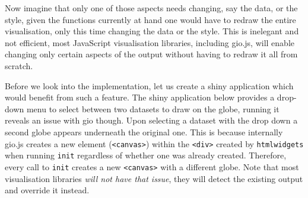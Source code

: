 \documentclass[10pt,]{krantz}
\begin{document}
Now imagine that only one of those aspects needs changing, say the data, or the style, given the functions currently at hand one would have to redraw the entire visualisation, only this time changing the data or the style. This is inelegant and not efficient, most JavaScript visualisation libraries, including gio.js, will enable changing only certain aspects of the output without having to redraw it all from scratch.

Before we look into the implementation, let us create a shiny application which would benefit from such a feature. The shiny application below provides a drop-down menu to select between two datasets to draw on the globe, running it reveals an issue with gio though. Upon selecting a dataset with the drop down a second globe appears underneath the original one. This is because internally gio.js creates a new element (\texttt{\textless{}canvas\textgreater{}}) within the \texttt{\textless{}div\textgreater{}} created by \texttt{htmlwidgets} when running \texttt{init} regardless of whether one was already created. Therefore, every call to \texttt{init} creates a new \texttt{\textless{}canvas\textgreater{}} with a different globe. Note that most visualisation libraries \emph{will not have that issue}, they will detect the existing output and override it instead.
\end{document}
